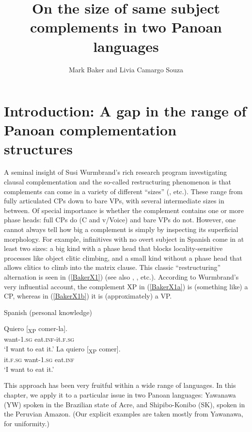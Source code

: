 \documentclass[output=paper,colorlinks,citecolor=brown,
]{langscibook}
\author{Mark Baker\affiliation{Rutgers University} and Livia Camargo Souza\affiliation{Rutgers University}\orcid{}}
\title{On the size of same subject complements in two Panoan languages}
\renewcommand{\sc}[1]{\textsc{#1}}
\begin{document}
\maketitle

\section{Introduction: A gap in the range of Panoan complementation structures}
A seminal insight of Susi Wurmbrand’s rich research program investigating clausal complementation and the so-called restructuring phenomenon is that complements can come in a variety of different “sizes” (\citealt{wurmbrand2001infinitives}, etc.). These range from fully articulated CPs down to bare VPs, with several intermediate sizes in between. Of special importance is whether the complement contains one or more phase heads: full CPs do (C and v/Voice) and bare VPs do not. However, one cannot always tell how big a complement is simply by inspecting its superficial morphology. For example, infinitives with no overt subject in Spanish come in at least two sizes: a big kind with a phase head that blocks locality-sensitive processes like object clitic climbing, and a small kind without a phase head that allows clitics to climb into the matrix clause. This classic “restructuring” alternation is seen in (\ref{BakerX1}) (see also \citealt{rizzi1982issues}, \citealt{burzio1986italian}, etc.). According to Wurmbrand’s very influential account, the complement XP in (\ref{BakerX1a}) is (something like) a CP, whereas in (\ref{BakerX1b}) it is (approximately) a VP.

\begin{exe}
    \ex Spanish (personal knowledge)\label{BakerX1}
	    \begin{xlist}
			\ex \label{BakerX1a}
			\gll Quiero [\textsubscript{XP }comer-la].\\
			        want-1.\sc{sg} eat.\sc{inf}-it.\sc{f.sg}\\
			    \glt `I want to eat it.'
			\ex \label{BakerX1b}
			\gll La quiero [\textsubscript{XP }comer].\\
			        it.\sc{f.sg} want-1.\sc{sg} eat.\sc{inf}\\
			    \glt `I want to eat it.'
		\end{xlist}
\end{exe}

This approach has been very fruitful within a wide range of languages. In this chapter, we apply it to a particular issue in two Panoan languages: Yawanawa (YW) spoken in the Brazilian state of Acre, and Shipibo-Konibo (SK), spoken in the Peruvian Amazon. (Our explicit examples are taken mostly from Yawanawa, for uniformity.)\\
\end{document}
